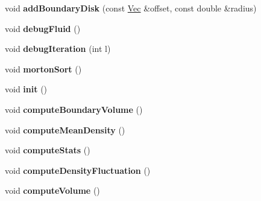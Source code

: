 \begin{DoxyCompactItemize}
\item 
\hypertarget{classhokusai_1_1System_a1c7bc4b0c82937b65da0b445450e9b06}{void {\bfseries add\+Boundary\+Disk} (const \hyperlink{classhokusai_1_1Vec3}{Vec} \&offset, const double \&radius)}\label{classhokusai_1_1System_a1c7bc4b0c82937b65da0b445450e9b06}

\item 
\hypertarget{classhokusai_1_1System_a576ed060f4b123eb3621ff1e5e2db8f2}{void {\bfseries debug\+Fluid} ()}\label{classhokusai_1_1System_a576ed060f4b123eb3621ff1e5e2db8f2}

\item 
\hypertarget{classhokusai_1_1System_a2f9ffc1b0288aef9d590f904b73f7d98}{void {\bfseries debug\+Iteration} (int l)}\label{classhokusai_1_1System_a2f9ffc1b0288aef9d590f904b73f7d98}

\item 
\hypertarget{classhokusai_1_1System_ad555a840021b69ebc3d23bddf29161cf}{void {\bfseries morton\+Sort} ()}\label{classhokusai_1_1System_ad555a840021b69ebc3d23bddf29161cf}

\item 
\hypertarget{classhokusai_1_1System_aa1b0cd0ea1da4d636f07fd19e09553d4}{void {\bfseries init} ()}\label{classhokusai_1_1System_aa1b0cd0ea1da4d636f07fd19e09553d4}

\item 
\hypertarget{classhokusai_1_1System_a6474261bf6782c04bcf3cc1f17e42bcc}{void {\bfseries compute\+Boundary\+Volume} ()}\label{classhokusai_1_1System_a6474261bf6782c04bcf3cc1f17e42bcc}

\item 
\hypertarget{classhokusai_1_1System_a56297f2e801b1f619b5b85efe13dc309}{void {\bfseries compute\+Mean\+Density} ()}\label{classhokusai_1_1System_a56297f2e801b1f619b5b85efe13dc309}

\item 
\hypertarget{classhokusai_1_1System_a586f89058e9eb2024b58e96ab6383b02}{void {\bfseries compute\+Stats} ()}\label{classhokusai_1_1System_a586f89058e9eb2024b58e96ab6383b02}

\item 
\hypertarget{classhokusai_1_1System_a978da9f525adbe32b93862b4a607219c}{void {\bfseries compute\+Density\+Fluctuation} ()}\label{classhokusai_1_1System_a978da9f525adbe32b93862b4a607219c}

\item 
\hypertarget{classhokusai_1_1System_a5f9be7947b05b3bf0fb94f04bff9c8be}{void {\bfseries compute\+Volume} ()}\label{classhokusai_1_1System_a5f9be7947b05b3bf0fb94f04bff9c8be}


\end{DoxyCompactItemize}
